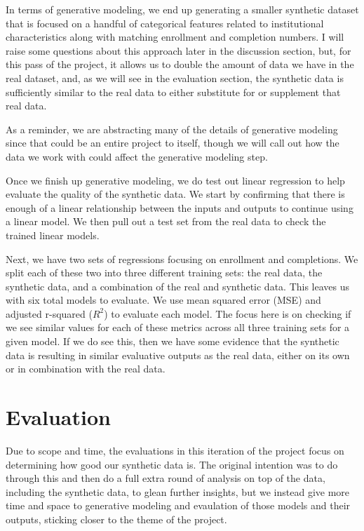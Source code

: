 \documentclass[sigconf, authorversion, nonacm]{acmart}
\begin{document}
        In terms of generative modeling, we end up generating a smaller synthetic dataset that is focused on a handful of categorical features related to institutional characteristics along with matching enrollment and completion numbers. I will raise some questions about this approach later in the discussion section, but, for this pass of the project, it allows us to double the amount of data we have in the real dataset, and, as we will see in the evaluation section, the synthetic data is sufficiently similar to the real data to either substitute for or supplement that real data.

        As a reminder, we are abstracting many of the details of generative modeling since that could be an entire project to itself, though we will call out how the data we work with could affect the generative modeling step.

        Once we finish up generative modeling, we do test out linear regression to help evaluate the quality of the synthetic data. We start by confirming that there is enough of a linear relationship between the inputs and outputs to continue using a linear model. We then pull out a test set from the real data to check the trained linear models.

        Next, we have two sets of regressions focusing on enrollment and completions. We split each of these two into three different training sets: the real data, the synthetic data, and a combination of the real and synthetic data. This leaves us with six total models to evaluate. We use mean squared error (MSE) and adjusted r-squared ($R^2$) to evaluate each model. The focus here is on checking if we see similar values for each of these metrics across all three training sets for a given model. If we do see this, then we have some evidence that the synthetic data is resulting in similar evaluative outputs as the real data, either on its own or in combination with the real data.

\section{Evaluation}
    Due to scope and time, the evaluations in this iteration of the project focus on determining how good our synthetic data is. The original intention was to do through this and then do a full extra round of analysis on top of the data, including the synthetic data, to glean further insights, but we instead give more time and space to generative modeling and evaulation of those models and their outputs, sticking closer to the theme of the project.
\end{document}
